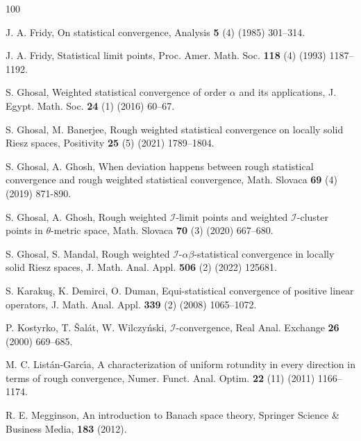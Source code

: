 \documentclass[reqno]{amsart}
\begin{document}
{\begin{thebibliography}{100}
	
	 J. A. Fridy, On statistical convergence, Analysis {\textbf{5}} (4) (1985) {301--314}.
	
	  J. A. Fridy, Statistical limit points,  Proc. Amer. Math. Soc. {\textbf{118}} (4) (1993) {1187--1192}.
	
	 S. Ghosal, Weighted statistical convergence of order $\alpha$ and its applications, J. Egypt. Math. Soc. \textbf{24} (1) (2016) {60--67}.
	
	  S. Ghosal, M. Banerjee,  Rough weighted statistical convergence on locally solid Riesz spaces, Positivity {\textbf{25}} (5) (2021) 1789--1804.

	
	 S. Ghosal, A. Ghosh,	When deviation happens between rough statistical convergence and rough weighted statistical convergence, Math. Slovaca {\textbf{69}} (4) (2019) 871-890.
	
	 S. Ghosal, A. Ghosh, Rough weighted $\mathcal{I}$-limit points and weighted $\mathcal{I}$-cluster points in $\theta$-metric space, Math. Slovaca {\textbf{70}} (3) (2020)  {667--680}.
	
 S. Ghosal, S. Mandal, Rough weighted $\mathcal{I}$-$\alpha\beta$-statistical convergence in locally solid Riesz spaces, J. Math. Anal. Appl. {\bf 506} (2) (2022) 125681. 

 S. Karaku{\c{s}}, K. Demirci, O. Duman, Equi-statistical convergence of positive linear operators, J. Math. Anal. Appl. \textbf{339} (2) (2008) {1065--1072}.
	
 P. Kostyrko, T. {\v{S}}al{\'a}t, W. Wilczy{\'n}ski, $\mathcal{I}$-convergence, Real Anal. Exchange {\textbf{26}} (2000) {669--685}.
	
		
 M. C. List{\'a}n-Garc{\'\i}a, A characterization of uniform rotundity in every direction in terms of rough convergence, Numer. Funct. Anal. Optim. {\textbf{22}} (11) (2011) 1166--1174. 
	

 R. E. Megginson, An introduction to Banach space theory, Springer Science \& Business Media, \textbf{183} (2012).
	
	
	


\end{thebibliography}}
\end{document}
